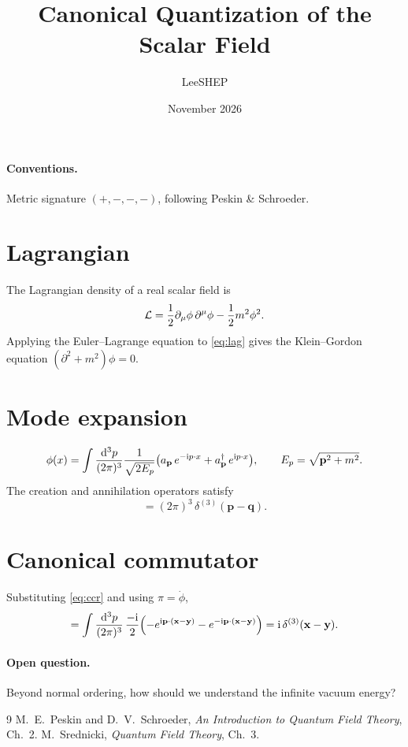 \documentclass[11pt]{article}
\title{Canonical Quantization of the Scalar Field}
\author{LeeSHEP}
\date{November 2026}
\begin{document}
\maketitle

\paragraph{Conventions.} Metric signature $(+,-,-,-)$, following Peskin \& Schroeder.

\section{Lagrangian}

The Lagrangian density of a real scalar field is
\begin{equation}
  \mathcal{L} = \frac{1}{2}\partial_\mu\phi\,\partial^\mu\phi - \frac{1}{2}m^2\phi^2 .
  \label{eq:lag}
\end{equation}
Applying the Euler--Lagrange equation to \eqref{eq:lag} gives the Klein--Gordon
equation $(\partial^2 + m^2)\phi = 0$.

\section{Mode expansion}

\begin{equation}
  \phi(x) = \int \frac{\dd[3]{p}}{(2\pi)^3}\frac{1}{\sqrt{2E_p}}
  \qty( a_{\mathbf p}\, e^{-\mathrm{i} p\cdot x} + a^\dagger_{\mathbf p}\, e^{\mathrm{i} p\cdot x} ),
  \qquad E_p = \sqrt{\mathbf p^2 + m^2}.
\end{equation}
The creation and annihilation operators satisfy
\begin{equation}
  [a_{\mathbf p}, a^\dagger_{\mathbf q}] = (2\pi)^3\,\delta^{(3)}(\mathbf p - \mathbf q).
  \label{eq:ccr}
\end{equation}

\section{Canonical commutator}

Substituting \eqref{eq:ccr} and using $\pi = \dot\phi$,
\begin{equation}
  [\phi(\mathbf x), \pi(\mathbf y)]
  = \int \frac{\dd[3]{p}}{(2\pi)^3}\,\frac{-\ii}{2}
    \qty( -e^{\ii \mathbf p\cdot(\mathbf x-\mathbf y)} - e^{-\ii \mathbf p\cdot(\mathbf x-\mathbf y)} )
  = \ii\,\delta^{(3)}(\mathbf x-\mathbf y).
\end{equation}

\paragraph{Open question.} Beyond normal ordering, how should we understand the
infinite vacuum energy?

\begin{thebibliography}{9}
   M.~E.~Peskin and D.~V.~Schroeder, \emph{An Introduction to Quantum Field Theory}, Ch.~2.
   M.~Srednicki, \emph{Quantum Field Theory}, Ch.~3.
\end{thebibliography}
\end{document}
